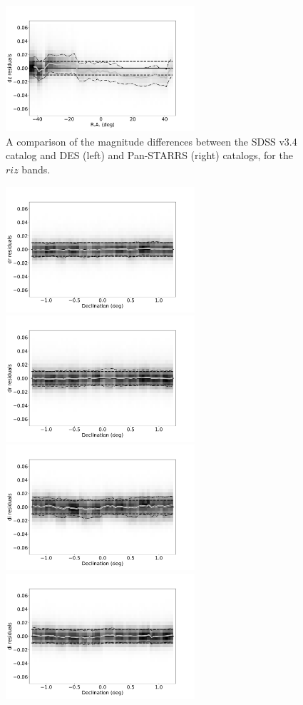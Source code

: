 \begin{figure}[th!]
    \centering\includegraphics[width=7cm]{figures/colorResidPSbright_dz_RA_Hess.png}
\caption{A comparison of the magnitude differences between the SDSS v3.4 catalog
and DES (left) and Pan-STARRS (right) catalogs, for the $riz$ bands.}
\label{fig:DESPSRA}
\end{figure}

\begin{figure}[th!]
    \centering\includegraphics[width=7cm]{figures/colorResidDES2bright_dr_Dec_Hess.png}
    \centering\includegraphics[width=7cm]{figures/colorResidPSbright_dr_Dec_Hess.png}
    \centering\includegraphics[width=7cm]{figures/colorResidDES2bright_di_Dec_Hess.png}
    \centering\includegraphics[width=7cm]{figures/colorResidPSbright_di_Dec_Hess.png}

\end{figure}
